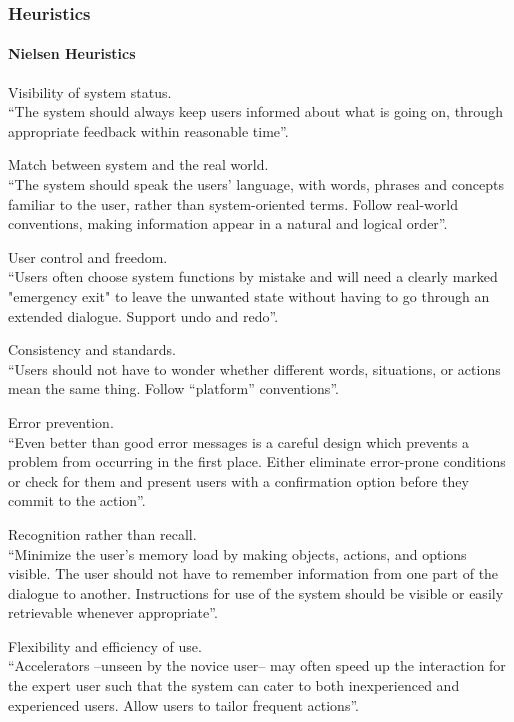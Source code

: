 \documentclass[11pt, letterpaper]{article}
\begin{document}
\subsubsection{Heuristics}
\paragraph{Nielsen Heuristics}
\begin{NH}
    \item  Visibility of system status. \\
            “The system should always keep users informed about what is going on, through appropriate feedback within reasonable time”.
    \item Match between system and the real world. \\
            “The system should speak the users' language, with words, phrases and concepts familiar to the user, rather than system-oriented terms. Follow real-world conventions, making information appear in a natural and logical order”.
    \item User control and freedom. \\
            “Users often choose system functions by mistake and will need a clearly marked "emergency exit" to leave the unwanted state without having to go through an extended dialogue. Support undo and redo”.
    \item Consistency and standards. \\
            “Users should not have to wonder whether different words, situations, or actions mean the same thing. Follow “platform” conventions”. 
    \item Error prevention. \\
            “Even better than good error messages is a careful design which prevents a problem from occurring in the first place. Either eliminate error-prone conditions or check for them and present users with a confirmation option before they commit to the action”.
    \item Recognition rather than recall. \\
            “Minimize the user's memory load by making objects, actions, and options visible. The user should not have to remember information from one part of the dialogue to another. Instructions for use of the system should be visible or easily retrievable whenever appropriate”.
    \item Flexibility and efficiency of use. \\
            “Accelerators --unseen by the novice user-- may often speed up the interaction for the expert user such that the system can cater to both inexperienced and experienced users. Allow users to tailor frequent actions”.

\end{NH}
\end{document}
